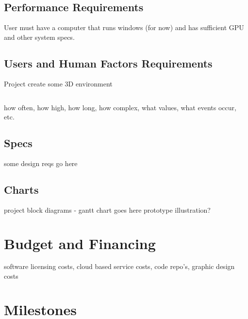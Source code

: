 \documentclass[a4paper,10pt]{article}
\begin{document}
\subsection{Performance Requirements}
\begin{number}
\item User must have a computer that runs windows (for now) and has sufficient GPU and other system specs.  
\item
\item
\end{number}
\subsection{Users and Human Factors Requirements}
\begin{number}
\item Project create some 3D environment 
\item
\item
\end{number}
\subsection{}

how often, how high, how long, how complex, what values, what events occur, etc.
\subsection{Specs}
some design reqs go here
\subsection{Charts}
project block diagrams - gantt chart goes here
prototype illustration?

\section{Budget and Financing}
software licensing costs, cloud based service costs, code repo's, graphic design costs
\section{Milestones}
\end{document}
